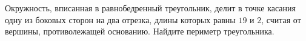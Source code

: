 \begin{ex}
	\begin{condition}
		Окружность, вписанная в равнобедренный треугольник, делит в точке касания одну из боковых сторон на два отрезка, длины которых равны \( 19  \) и \( 2 \), считая от вершины, противолежащей основанию. Найдите периметр треугольника.
	\end{condition}
\end{ex}